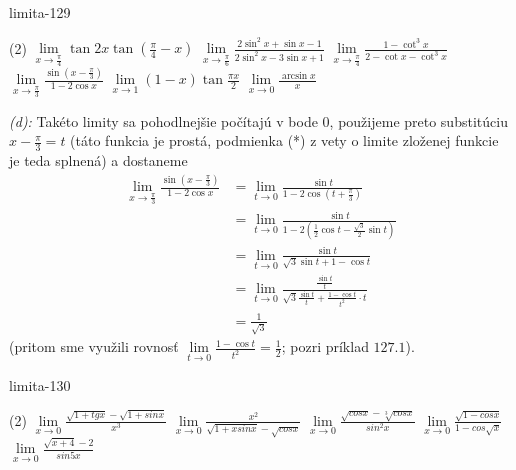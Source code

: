 \begin{defproblem}{limita-129}
\begin{tasks}(2)
    \task $\lim\limits_{x \rightarrow \frac{\pi}{4}}
        \tan 2x \tan(\frac{\pi}{4}-x)$
    \task $\lim\limits_{x \rightarrow \frac{\pi}{6}}
        \frac{2 \sin^2 x +\sin x -1}{2 \sin^2 x - 3 \sin x + 1}$
    \task $\lim\limits_{x \rightarrow \frac{\pi}{4}}
        \frac{1-\cot^3 x}{2- \cot x - \cot^3 x}$
    \task $\lim\limits_{x \rightarrow \frac{\pi}{3}}
        \frac{\sin(x-\frac{\pi}{3})}{1-2\cos x}$
    \task $\lim\limits_{x \rightarrow 1} (1-x) \tan \frac{\pi x}{2}$
    \task $\lim\limits_{x \rightarrow 0} \frac{\arcsin x}{x}$
\end{tasks}

\begin{solution}
    \textit{(d):}
    Takéto limity sa pohodlnejšie počítajú v bode $0$, použijeme preto
    substitúciu $x-\frac{\pi}{3}=t$ (táto funkcia je prostá, podmienka (*) z
    vety o limite zloženej funkcie je teda splnená) a dostaneme
    \begin{align*}
        \lim\limits_{x \rightarrow \frac{\pi}{3}}
            \frac{\sin (x-\frac{\pi}{3})}{1-2 \cos{x}}
        &= \lim\limits_{t \rightarrow 0} \frac{\sin t}{1-2 \cos(t+\frac{\pi}{3})} \\
        &= \lim\limits_{t \rightarrow 0}
            \frac{\sin t}{1-2(\frac{1}{2}\cos t -\frac{\sqrt{3}}{2}\sin t)} \\
        &= \lim\limits_{t \rightarrow 0} \frac{\sin t}{\sqrt{3}\sin t + 1 - \cos t} \\
        &= \lim\limits_{t \rightarrow 0} \frac{\frac{\sin t}{t}}{\sqrt{3}\frac{\sin t}{t}
           +\frac{1 - \cos t}{t^2}\cdot t} \\
        &= \frac{1}{\sqrt{3}}
    \end{align*}
    (pritom sme využili rovnosť $\lim\limits_{t \rightarrow 0} \frac{1-\cos t}{t^2}
    =\frac{1}{2}$; pozri príklad $127.1$).

\end{solution}
\end{defproblem}

\begin{defproblem}{limita-130}
\begin{tasks}(2)
    \task $\lim\limits_{{x \rightarrow 0}} \frac{\sqrt{1+tg x}-\sqrt{1+sin x}}{x^3}$
    \task $\lim\limits_{{x \rightarrow 0}} \frac{x^2}{\sqrt{1+x sin x}-\sqrt{cos x}}$
    \task $\lim\limits_{{x \rightarrow 0}} \frac{\sqrt{cos x}-\sqrt[3]{cos x}}{sin^2 x}$
    \task $\lim\limits_{{x \rightarrow 0}} \frac{\sqrt{1-cos x}}{1-cos \sqrt{x}}$
    \task $\lim\limits_{{x \rightarrow 0}} \frac{\sqrt{x+4}-2}{sin 5x}$
\end{tasks}
\end{defproblem}

